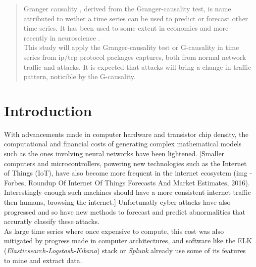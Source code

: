 
\date{Received: date / Accepted: date}


\maketitle

\begin{abstract}
    Granger causality \cite{Ref_1}, derived from the Granger-causality test, is name attributed to wether a time series can be used to predict or forecast other time series. It has been used to some extent in economics \cite{Ref_2} and more recently in neuroscience \cite{Ref_3}.\\
    This study will apply the Granger-causality test or G-causality in time series from ip/tcp protocol packages captures, both from normal network traffic and attacks. It is expected that attacks will bring a change in traffic pattern, noticible by the G-causality. 
\end{abstract}

\section{Introduction}
\label{intro}   
    With advancements made in computer hardware and transistor chip density, the computational and financial costs of generating complex mathematical models such as the ones involving neural networks have been lightened. [Smaller computers and microcontrollers, powering new technologies such as the Internet of Things (IoT), have also become more frequent in the internet ecosystem (img - Forbes, Roundup Of Internet Of Things Forecasts And Market Estimates, 2016). Interestingly enough such machines should have a more consistent internet traffic then humans, browsing the internet.] Unfortunatly cyber attacks have also progressed and so have new methods to forecast and predict abnormalities that accuratly classify these attacks.\\
    As large time series where once expensive to compute, this cost was also mitigated by progress made in computer architectures, and software like the ELK (\textit{Elasticsearch-Logstash-Kibana}) \cite{Ref_6} stack or \textit{Splunk} \textregistered \cite{Ref_7} already use some of its features to mine and extract data.
